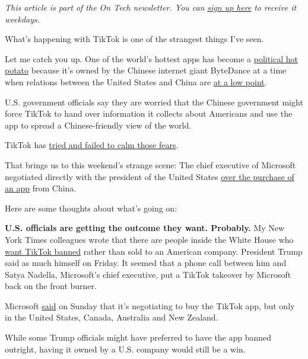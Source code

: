 \emph{This article is part of the On Tech newsletter. You can}
\href{https://www.nytimes.com/newsletters/signup/OT}{\emph{sign up
here}} \emph{to receive it weekdays.}

What's happening with TikTok is one of the strangest things I've seen.

Let me catch you up. One of the world's hottest apps has become a
\href{https://www.nytimes.com/2020/07/27/technology/tiktok-data-privacy.html}{political
hot potato} because it's owned by the Chinese internet giant ByteDance
at a time when relations between the United States and China are
\href{https://www.nytimes.com/2020/07/22/world/asia/us-china-cold-war.html}{at
a low point}.

U.S. government officials say they are worried that the Chinese
government might force TikTok to hand over information it collects about
Americans and use the app to spread a Chinese-friendly view of the
world.

TikTok has
\href{https://www.nytimes.com/2020/08/03/technology/tiktok-trump-sale-microsoft.html}{tried
and failed to calm those fears}.

That brings us to this weekend's strange scene: The chief executive of
Microsoft negotiated directly with the president of the United States
\href{https://www.nytimes.com/2020/08/01/technology/tiktok-trump-microsoft-bytedance-china-ban.html}{over
the purchase of an app} from China.

Here are some thoughts about what's going on:

\textbf{U.S. officials are getting the outcome they want. Probably.} My
New York Times colleagues wrote that there are people inside the White
House who
\href{https://www.nytimes.com/2020/08/02/business/economy/trump-tiktok-china-national-security.html}{want
TikTok banned} rather than sold to an American company. President Trump
said as much himself on Friday. It seemed that a phone call between him
and Satya Nadella, Microsoft's chief executive, put a TikTok takeover by
Microsoft back on the front burner.

Microsoft
\href{https://blogs.microsoft.com/blog/2020/08/02/microsoft-to-continue-discussions-on-potential-tiktok-purchase-in-the-united-states/}{said}
on Sunday that it's negotiating to buy the TikTok app, but only in the
United States, Canada, Australia and New Zealand.

While some Trump officials might have preferred to have the app banned
outright, having it owned by a U.S. company would still be a win.

